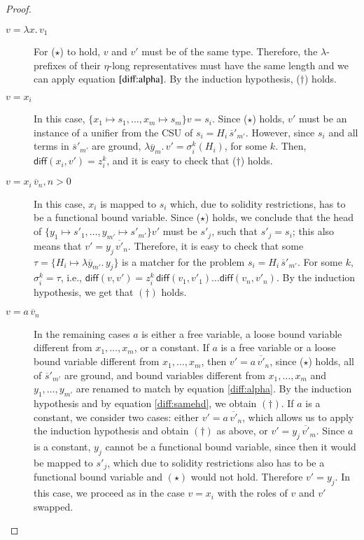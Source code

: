 \begin{proof}
  \begin{description}
    \item[$v = \lambda x. \, v_1$]  For ($\star$) to hold, $v$ and $v'$ must be of the
    same type. Therefore, the $\lambda$-prefixes of their $\eta$-long representatives
    must have the same length and we can apply equation
    $\ref{diff:alpha}$. By the induction hypothesis, ($\dagger$) holds.
    \item[$v = x_i$] In this case, $\{x_1 \mapsto s_1, \ldots, x_m \mapsto
    s_m\} v = s_i$. Since ($\star$) holds, $v'$ must be an instance of a unifier from
    the CSU of $s_i = H_i \, \overline{s}'_{m'}$. However, since $s_i$ and all
    terms in $\overline{s}'_{m'}$ are ground, $\lambda \overline{y}_m. \, v' =
    \sigma_i^k(H_i)$, for some $k$. Then, $\textsf{diff}(x_i, v') = z_i^k$, and
    it is easy to check that ($\dagger$) holds.
    \item[$v = x_i \, \overline{v}_n, n > 0$] In this case, $x_i$ is mapped to $s_i$
    which, due to solidity restrictions, has to be a functional bound variable.
    Since ($\star$) holds, we conclude that the head of $\{y_1 \mapsto s'_1, \ldots,
    y_{m'} \mapsto  s'_{m'}\}v'$ must be $s'_{j}$, such that $s'_{j} = s_i$;
    this also means that $v' = y_j \, \overline{v'}_n$. Therefore, it is easy to
    check that some $\tau = \{ H_i \mapsto \lambda \overline{y}_{m'}. \, y_j\}$ is
    a matcher for the problem $s_i = H_i \, \overline{s}'_{m'}$. For some $k$,
    $\sigma_i^k = \tau$, i.e., $\textsf{diff}(v,v') = z_i^k \, \textsf{diff}(v_1, v'_1)
    \ldots \textsf{diff}(v_n, v'_n) $. By the induction hypothesis, we get that $(\dagger)$ holds.
    \item[$v = a \, \overline{v}_n$] In the remaining cases $a$ is either a free variable, a loose bound variable
    different from $x_1, \ldots, x_m$, or a constant. If $a$ is a free variable or a loose bound variable
    different from $x_1, \ldots, x_m$, then $v' = a \, \overline{v'}_n$, since
    ($\star$) holds, all of $\overline{s}'_{m'}$ are ground, and bound variables different from
    $x_1, \ldots, x_m$ and $y_1, \ldots, y_{m'}$ are renamed to match by equation \ref{diff:alpha}. 
    By the induction
    hypothesis and by equation \ref{diff:samehd}, we obtain $(\dagger)$. If $a$ is a constant, we consider two
    cases: either $v' = a \, \overline{v'}_n$, which allows us to apply the induction
    hypothesis and obtain $(\dagger)$ as above, or $v' = y_j \, \overline{v'}_m$.
    Since $a$ is a constant, $y_j$ cannot be a functional bound variable, since
    then it would be mapped to $s'_j$, which due to solidity restrictions 
    also has to be a functional bound
    variable and $(\star)$ would not hold. Therefore $v' = y_j$. In this case, we
    proceed as in the case $v = x_i$ with the roles of $v$ and $v'$ swapped. \qedhere
  \end{description}
  



\end{proof}
